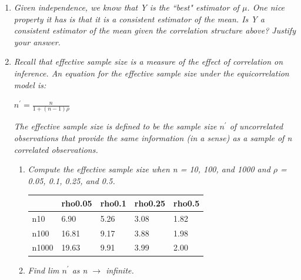 \documentclass{article}\usepackage[]{graphicx}\usepackage[]{color}
\begin{document}
\begin{enumerate}
\begin{enumerate}
{\bf Assuming Correlated:}


$\bar{y} \pm 1.96(\frac{\sigma^{2}}{n}[1+(n-1)\rho])^{1/2})$


= $\bar{y} \pm 1.96(\frac{\sigma^{2}}{10}[1+(10-1)*0.26])^{1/2})$


= $\bar{y} \pm 1.13*\sigma$


\item %

{\it Given independence, we know that Y is the ``best" estimator of $\mu$. One nice property it has is that it is a consistent estimator of the mean. Is Y a consistent estimator of the mean given the correlation structure above? Justify your answer.}
\vspace{4in}

\newpage
\item %
{\it Recall that effective sample size is a measure of the effect of correlation on inference. An equation for the effective sample size under the equicorrelation model is:}
\begin{center}
$n^{'} = \frac{n}{1+(n-1)\rho}$
\end{center}


{\it The effective sample size is defined to be the sample size $n^{'}$ of uncorrelated observations that provide the same information (in a sense) as a sample of n correlated observations.}

\begin{enumerate}
\item %

{\it Compute the effective sample size when n = 10, 100, and 1000 and $\rho$ = 0.05, 0.1, 0.25, and 0.5.}

\begin{table}[ht]
\centering
\begin{tabular}{||l|l|l|l|l||}
  \hline
 & rho0.05 & rho0.1 & rho0.25 & rho0.5 \\ 
  \hline
n10 & 6.90 & 5.26 & 3.08 & 1.82 \\ 
  n100 & 16.81 & 9.17 & 3.88 & 1.98 \\ 
  n1000 & 19.63 & 9.91 & 3.99 & 2.00 \\ 
   \hline
\end{tabular}
\end{table}


\item %
{\it Find lim $n^{'}$ as n $\rightarrow$ infinite.}

\vspace{3in}


\end{enumerate}
\end{enumerate}
\end{enumerate}
\end{document}
